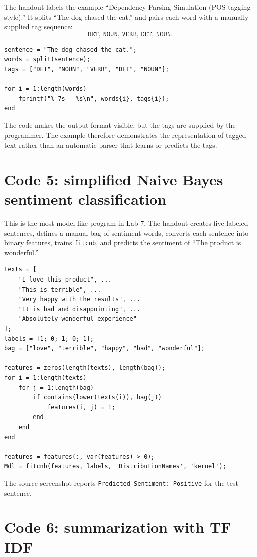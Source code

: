 The handout labels the example ``Dependency Parsing Simulation (POS tagging-style).'' It splits ``The dog chased the cat.'' and pairs each word with a manually supplied tag sequence:
\[
\texttt{DET, NOUN, VERB, DET, NOUN}.
\]

\begin{lstlisting}[style=mlmatlab]
sentence = "The dog chased the cat.";
words = split(sentence);
tags = ["DET", "NOUN", "VERB", "DET", "NOUN"];

for i = 1:length(words)
    fprintf("%-7s - %s\n", words{i}, tags{i});
end
\end{lstlisting}

\begin{intuition}
The code makes the output format visible, but the tags are supplied by the programmer. The example therefore demonstrates the representation of tagged text rather than an automatic parser that learns or predicts the tags.
\end{intuition}

\section{Code 5: simplified Naive Bayes sentiment classification}

This is the most model-like program in Lab 7. The handout creates five labeled sentences, defines a manual bag of sentiment words, converts each sentence into binary features, trains \texttt{fitcnb}, and predicts the sentiment of ``The product is wonderful.''

\begin{lstlisting}[style=mlmatlab]
texts = [
    "I love this product", ...
    "This is terrible", ...
    "Very happy with the results", ...
    "It is bad and disappointing", ...
    "Absolutely wonderful experience"
];
labels = [1; 0; 1; 0; 1];
bag = ["love", "terrible", "happy", "bad", "wonderful"];

features = zeros(length(texts), length(bag));
for i = 1:length(texts)
    for j = 1:length(bag)
        if contains(lower(texts(i)), bag(j))
            features(i, j) = 1;
        end
    end
end

features = features(:, var(features) > 0);
Mdl = fitcnb(features, labels, 'DistributionNames', 'kernel');
\end{lstlisting}

The source screenshot reports \texttt{Predicted Sentiment: Positive} for the test sentence.

\section{Code 6: summarization with TF--IDF}

